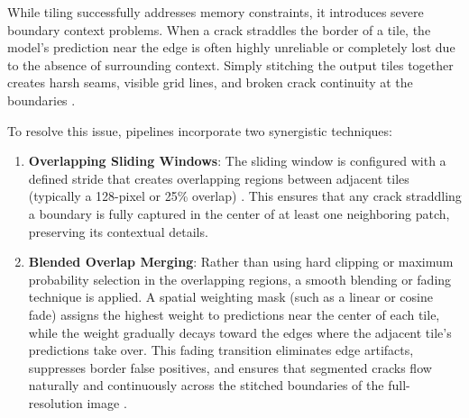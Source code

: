 \hs While tiling successfully addresses memory constraints, it introduces severe boundary context problems. When a crack straddles the border of a tile, the model's prediction near the edge is often highly unreliable or completely lost due to the absence of surrounding context. Simply stitching the output tiles together creates harsh seams, visible grid lines, and broken crack continuity at the boundaries \cite{akyon-2022}.

To resolve this issue, pipelines incorporate two synergistic techniques:
\begin{enumerate}
    \item \textbf{Overlapping Sliding Windows}: The sliding window is configured with a defined stride that creates overlapping regions between adjacent tiles (typically a 128-pixel or 25\% overlap) \cite{akyon-2022}. This ensures that any crack straddling a boundary is fully captured in the center of at least one neighboring patch, preserving its contextual details.
    \item \textbf{Blended Overlap Merging}: Rather than using hard clipping or maximum probability selection in the overlapping regions, a smooth blending or fading technique is applied. A spatial weighting mask (such as a linear or cosine fade) assigns the highest weight to predictions near the center of each tile, while the weight gradually decays toward the edges where the adjacent tile's predictions take over. This fading transition eliminates edge artifacts, suppresses border false positives, and ensures that segmented cracks flow naturally and continuously across the stitched boundaries of the full-resolution image \cite{akyon-2022}.
\end{enumerate}